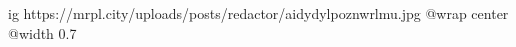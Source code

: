  
 
 
 
 

\ifcmt
  ig https://mrpl.city/uploads/posts/redactor/aidydylpoznwrlmu.jpg
  @wrap center
  @width 0.7
\fi
